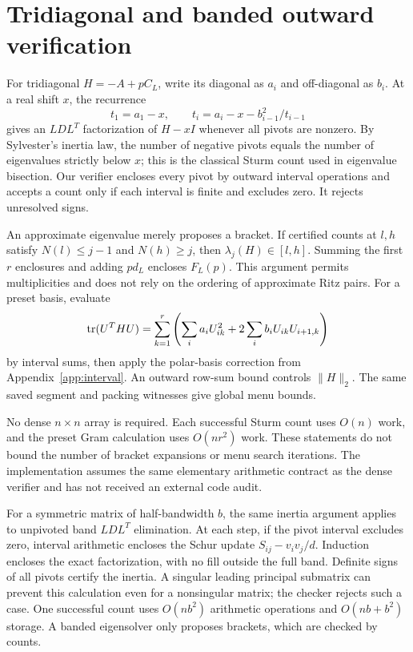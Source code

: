 \section{Tridiagonal and banded outward verification}\label{app:sturm}
For tridiagonal $H=-A+pC_L$, write its diagonal as $a_i$ and
off-diagonal as $b_i$. At a real shift $x$, the recurrence
\[
 t_1=a_1-x,\qquad t_i=a_i-x-b_{i-1}^2/t_{i-1}
\]
gives an $LDL^T$ factorization of $H-xI$ whenever all pivots are nonzero.
By Sylvester's inertia law, the number of negative pivots equals the
number of eigenvalues strictly below $x$; this is the classical Sturm
count used in eigenvalue bisection\cite{demmel1993}. Our verifier encloses
every pivot by outward interval operations and accepts a count only if
each interval is finite and excludes zero. It rejects unresolved signs.

An approximate eigenvalue merely proposes a bracket. If certified counts
at $l,h$ satisfy $N(l)\le j-1$ and $N(h)\ge j$, then
$\lambda_j(H)\in[l,h]$. Summing the first $r$ enclosures and adding $pd_L$
encloses $F_L(p)$. This argument permits multiplicities and does not rely
on the ordering of approximate Ritz pairs. For a preset basis, evaluate
\[
 \operatorname{tr}(U^THU)=\sum_{k=1}^r\left(\sum_i a_iU_{ik}^2+
                   2\sum_i b_iU_{ik}U_{i+1,k}\right)
\]
by interval sums, then apply the polar-basis correction from
Appendix~\ref{app:interval}. An outward row-sum bound controls $\|H\|_2$.
The same saved segment and packing witnesses give global menu bounds.

No dense $n\times n$ array is required. Each successful Sturm count uses
$O(n)$ work, and the preset Gram calculation uses $O(nr^2)$ work.
These statements do not bound the number of bracket expansions or menu
search iterations. The implementation assumes the same elementary
arithmetic contract as the dense verifier and has not received an external
code audit.

For a symmetric matrix of half-bandwidth $b$, the same inertia argument
applies to unpivoted band $LDL^T$ elimination. At each step, if the pivot
interval excludes zero, interval arithmetic encloses the Schur update
$S_{ij}-v_iv_j/d$. Induction encloses the exact factorization, with no fill
outside the full band. Definite signs of all pivots certify the inertia.
A singular leading principal submatrix can prevent this calculation even
for a nonsingular matrix; the checker rejects such a case. One successful
count uses $O(nb^2)$ arithmetic operations and $O(nb+b^2)$ storage. A
banded eigensolver only proposes brackets, which are checked by counts.

